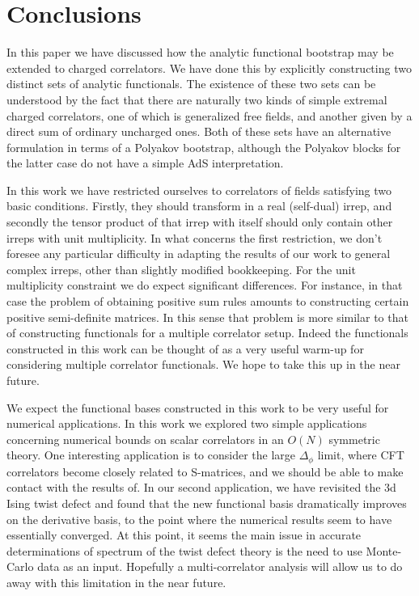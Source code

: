 \documentclass[12pt]{article}
\numberwithin{equation}{section}
\def\D{\Delta}
\begin{document}
	
	\section{Conclusions}\label{sec:conclusion}
	
	In this paper we have discussed how the analytic functional bootstrap may be extended to charged correlators. We have done this by explicitly constructing two distinct sets of analytic functionals. The existence of these two sets can be understood by the fact that there are naturally two kinds of simple extremal charged correlators, one of which is generalized free fields, and another given by a direct sum of ordinary uncharged ones. Both of these sets have an alternative formulation in terms of a Polyakov bootstrap, although the Polyakov blocks for the latter case do not have a simple AdS interpretation.
	
	In this work we have restricted ourselves to correlators of fields satisfying two basic conditions. Firstly, they should transform in a real (self-dual) irrep, and secondly the tensor product of that irrep with itself should only contain other irreps with unit multiplicity. In what concerns the first restriction, we don't foresee any particular difficulty in adapting the results of our work to general complex irreps, other than slightly modified bookkeeping. For the unit multiplicity constraint we do expect significant differences. For instance, in that case the problem of obtaining positive sum rules amounts to constructing certain positive semi-definite matrices. In this sense that problem is more similar to that of constructing functionals for a multiple correlator setup. Indeed the functionals constructed in this work can be thought of as a very useful warm-up for considering multiple correlator functionals. We hope to take this up in the near future.
	
	
	We expect the functional bases constructed in this work to be very useful for numerical applications. In this work we explored two simple applications concerning numerical bounds on scalar correlators in an $O(N)$ symmetric theory. One interesting application is to consider the large $\D_\phi$ limit, where CFT correlators become closely related to S-matrices, and we should be able to make contact with the results of\cite{Cordova:2019lot}.  In our second application, we  
	have revisited the 3d Ising twist defect and found that the new functional basis dramatically improves on the derivative basis, to the point where the numerical results seem to have essentially converged. At this point, it seems the main issue in accurate determinations of spectrum of the twist defect theory is the need to use Monte-Carlo data as an input. Hopefully a multi-correlator analysis will allow us to do away with this limitation in the near future.
	
\end{document}
